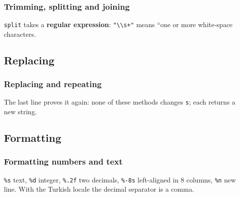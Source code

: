 \documentclass[aspectratio=169,10pt,compress]{beamer}
\begin{document}
\begin{frame}[t,fragile] \frametitle{Trimming, splitting and joining}

  \vspace{0.3em}
  \small \texttt{split} takes a \textbf{regular expression}: \texttt{"\textbackslash\textbackslash s+"} means ``one or more white-space characters.
\end{frame}

\subsection[Replace]{Replacing}




\begin{frame}[t,fragile] \frametitle{Replacing and repeating}

  \vspace{0.3em}
  \small The last line proves it again: none of these methods changes \texttt{s}; each returns a new string.
\end{frame}

\subsection[Format]{Formatting}




\begin{frame}[t,fragile] \frametitle{Formatting numbers and text}

  \vspace{0.3em}
  \small \texttt{\%s} text, \texttt{\%d} integer, \texttt{\%.2f} two decimals, \texttt{\%-8s} left-aligned in 8 columns, \texttt{\%n} new line.
  With the Turkish locale the decimal separator is a comma.
\end{frame}
\end{document}
